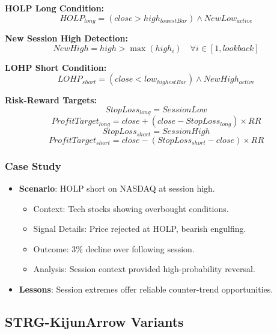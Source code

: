 \documentclass[12pt]{article}
\begin{document}
\textbf{HOLP Long Condition:}
\[
HOLP_{long} = (close > high_{lowestBar}) \land NewLow_{active}
\]

\textbf{New Session High Detection:}
\[
NewHigh = high > \max(high_{i}) \quad \forall i \in [1, lookback]
\]

\textbf{LOHP Short Condition:}
\[
LOHP_{short} = (close < low_{highestBar}) \land NewHigh_{active}
\]

\textbf{Risk-Reward Targets:}
\[
StopLoss_{long} = SessionLow
\]
\[
ProfitTarget_{long} = close + (close - StopLoss_{long}) \times RR
\]
\[
StopLoss_{short} = SessionHigh
\]
\[
ProfitTarget_{short} = close - (StopLoss_{short} - close) \times RR
\]

\subsubsection{Case Study}
\begin{itemize}
\item \textbf{Scenario}: HOLP short on NASDAQ at session high.
  \begin{itemize}
  \item Context: Tech stocks showing overbought conditions.
  \item Signal Details: Price rejected at HOLP, bearish engulfing.
  \item Outcome: 3\% decline over following session.
  \item Analysis: Session context provided high-probability reversal.
  \end{itemize}
\item \textbf{Lessons}: Session extremes offer reliable counter-trend opportunities.
\end{itemize}

\subsection{STRG-KijunArrow Variants}
\label{subsec:kijun_variants}
\end{document}
